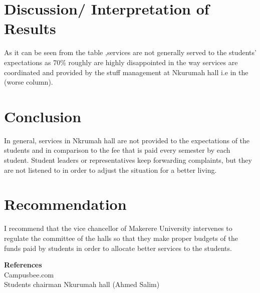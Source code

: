 \documentclass[12pt, a4paper]{article}
\begin{document}
\section{Discussion/ Interpretation of Results}
As it can be seen from the table ,services are not generally served to the students’ expectations as 70\% roughly are highly disappointed in the way services are coordinated and provided by the stuff management at Nkurumah hall i.e in the (worse column).





\section{Conclusion}
In general, services in Nkrumah hall are not provided to the expectations of the students and in comparison to the fee that is paid every semester by each student. Student leaders or representatives keep forwarding complaints, but they are not listened to in order to adjust the situation for a better living.
\section{Recommendation}
I recommend that the vice chancellor of Makerere University intervenes to regulate the committee of the halls so that they make proper budgets of the funds paid by students in order to allocate better services to the students.


\clearpage

\Large{\textbf{References}}\\
\normalsize Campusbee.com\\
Students chairman Nkurumah hall (Ahmed Salim)
\end{document}
